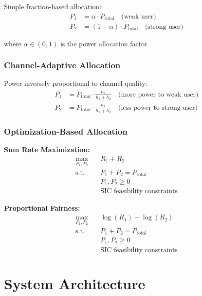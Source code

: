 \documentclass[11pt,a4paper]{article}
\begin{document}
Simple fraction-based allocation:
\begin{align}
P_1 &= \alpha \cdot P_{\text{total}} \quad \text{(weak user)} \\
P_2 &= (1-\alpha) \cdot P_{\text{total}} \quad \text{(strong user)}
\end{align}

where $\alpha \in (0, 1)$ is the power allocation factor.

\subsubsection{Channel-Adaptive Allocation}

Power inversely proportional to channel quality:
\begin{align}
P_1 &= P_{\text{total}} \cdot \frac{h_2}{h_1 + h_2} \quad \text{(more power to weak user)} \\
P_2 &= P_{\text{total}} \cdot \frac{h_1}{h_1 + h_2} \quad \text{(less power to strong user)}
\end{align}

\subsubsection{Optimization-Based Allocation}

\textbf{Sum Rate Maximization:}
\begin{align}
\max_{P_1,P_2} \quad &R_1 + R_2 \\
\text{s.t.} \quad &P_1 + P_2 = P_{\text{total}} \\
&P_1, P_2 \geq 0 \\
&\text{SIC feasibility constraints}
\end{align}

\textbf{Proportional Fairness:}
\begin{align}
\max_{P_1,P_2} \quad &\log(R_1) + \log(R_2) \\
\text{s.t.} \quad &P_1 + P_2 = P_{\text{total}} \\
&P_1, P_2 \geq 0 \\
&\text{SIC feasibility constraints}
\end{align}

\section{System Architecture}
\end{document}

